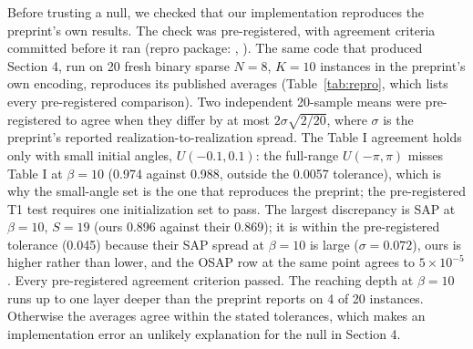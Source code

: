 \documentclass[11pt]{article}
\begin{document}
Before trusting a null, we checked that our implementation reproduces the preprint's own results. The check was pre-registered, with agreement criteria committed before it ran (repro package: , ). The same code that produced Section 4, run on 20 fresh binary sparse $N = 8$, $K = 10$ instances in the preprint's own encoding, reproduces its published averages (Table~\ref{tab:repro}, which lists every pre-registered comparison). Two independent 20-sample means were pre-registered to agree when they differ by at most $2\sigma\sqrt{2/20}$, where $\sigma$ is the preprint's reported realization-to-realization spread. The Table I agreement holds only with small initial angles, $U(-0.1, 0.1)$: the full-range $U(-\pi,\pi)$ misses Table I at $\beta = 10$ (0.974 against 0.988, outside the 0.0057 tolerance), which is why the small-angle set is the one that reproduces the preprint; the pre-registered T1 test requires one initialization set to pass. The largest discrepancy is SAP at $\beta = 10$, $S = 19$ (ours 0.896 against their 0.869); it is within the pre-registered tolerance (0.045) because their SAP spread at $\beta = 10$ is large ($\sigma = 0.072$), ours is higher rather than lower, and the OSAP row at the same point agrees to $5\times 10^{-5}$. Every pre-registered agreement criterion passed. The reaching depth at $\beta = 10$ runs up to one layer deeper than the preprint reports on 4 of 20 instances. Otherwise the averages agree within the stated tolerances, which makes an implementation error an unlikely explanation for the null in Section 4.
\end{document}
